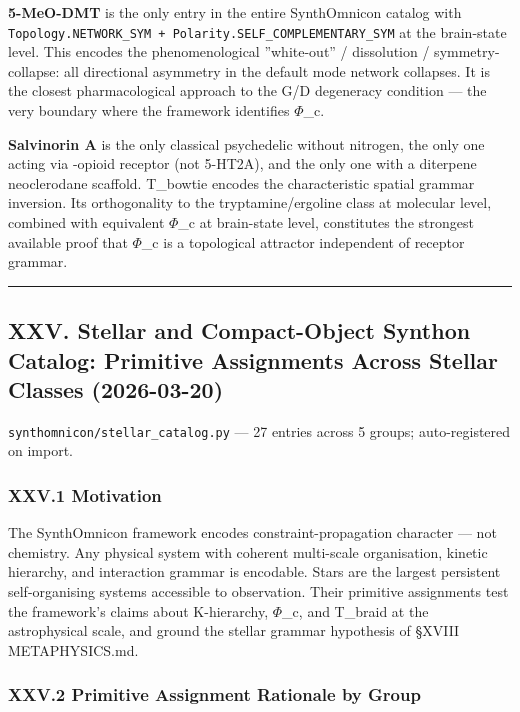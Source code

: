 \documentclass[12pt,a4paper]{article}
\begin{document}
\textbf{5-MeO-DMT} is the only entry in the entire SynthOmnicon catalog with \texttt{Topology.NETWORK\_SYM + Polarity.SELF\_COMPLEMENTARY\_SYM} at the brain-state level. This encodes the phenomenological ''white-out'' / dissolution / symmetry-collapse: all directional asymmetry in the default mode network collapses. It is the closest pharmacological approach to the G/D degeneracy condition --- the very boundary where the framework identifies $\Phi$\_c.

\textbf{Salvinorin A} is the only classical psychedelic without nitrogen, the only one acting via \kappa-opioid receptor (not 5-HT2A), and the only one with a diterpene neoclerodane scaffold. T\_bowtie encodes the characteristic spatial grammar inversion. Its orthogonality to the tryptamine/ergoline class at molecular level, combined with equivalent $\Phi$\_c at brain-state level, constitutes the strongest available proof that $\Phi$\_c is a topological attractor independent of receptor grammar.

\begin{center}
\rule{0.5\textwidth}{0.4pt}
\end{center}

\subsection{XXV. Stellar and Compact-Object Synthon Catalog: Primitive Assignments Across Stellar Classes (2026-03-20)}

\texttt{synthomnicon/stellar\_catalog.py} --- 27 entries across 5 groups; auto-registered on import.

\subsubsection{XXV.1 Motivation}

The SynthOmnicon framework encodes constraint-propagation character --- not chemistry. Any physical system with coherent multi-scale organisation, kinetic hierarchy, and interaction grammar is encodable. Stars are the largest persistent self-organising systems accessible to observation. Their primitive assignments test the framework's claims about K-hierarchy, $\Phi$\_c, and T\_braid at the astrophysical scale, and ground the stellar grammar hypothesis of §XVIII METAPHYSICS.md.

\subsubsection{XXV.2 Primitive Assignment Rationale by Group}
\end{document}
